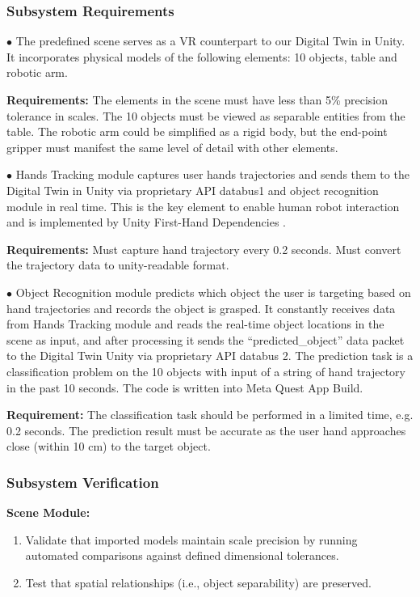 \documentclass{senior-design}
\begin{document}
\subsubsection*{Subsystem Requirements}
$\bullet$ The predefined scene serves as a VR counterpart to our Digital Twin in Unity. It incorporates physical models of the following elements: 10 objects, table and robotic arm. 

 

\textbf{Requirements:} The elements in the scene must have less than 5\% precision tolerance in scales. The 10 objects must be viewed as separable entities from the table. The robotic arm could be simplified as a rigid body, but the end-point gripper must manifest the same level of detail with other elements. 

 

$\bullet$ Hands Tracking module captures user hands trajectories and sends them to the Digital Twin in Unity via proprietary API databus1 and object recognition module in real time. This is the key element to enable human robot interaction and is implemented by Unity First-Hand Dependencies \cite{unity-firsthand}. 

 

\textbf{Requirements:} Must capture hand trajectory every 0.2 seconds. Must convert the trajectory data to unity-readable format.
 
$\bullet$ Object Recognition module predicts which object the user is targeting based on hand trajectories and records the object is grasped. It constantly receives data from Hands Tracking module and reads the real-time object locations in the scene as input, and after processing it sends the “predicted\_object” data packet to the Digital Twin Unity via proprietary API databus 2. The prediction task is a classification problem on the 10 objects with input of a string of hand trajectory in the past 10 seconds. The code is written into Meta Quest App Build. 

 

\textbf{Requirement:} The classification task should be performed in a limited time, e.g. 0.2 seconds. The prediction result must be accurate as the user hand approaches close (within 10 cm) to the target object.  

 
\subsubsection*{Subsystem Verification}
\textbf{Scene Module:} 
\begin{enumerate}
    \item Validate that imported models maintain scale precision by running automated comparisons against defined dimensional tolerances. 
    \item Test that spatial relationships (i.e., object separability) are preserved. 
\end{enumerate}
 
\end{document}
